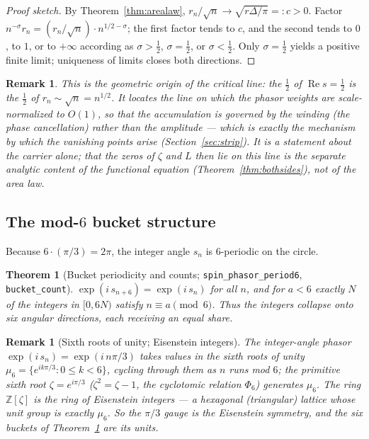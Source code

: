 \documentclass[11pt]{article}
\newtheorem{theorem}[definition]{Theorem}
\newtheorem{remark}[definition]{Remark}
\DeclareMathOperator{\Ree}{Re}
\newcommand{\Z}{\mathbb{Z}}
\newcommand{\code}[1]{\texttt{#1}}
\begin{document}
\begin{proof}[Proof sketch]
By Theorem~\ref{thm:arealaw}, $r_n/\sqrt n\to\sqrt{r\Delta/\pi}=:c>0$. Factor
$n^{-\sigma}r_n=(r_n/\sqrt n)\cdot n^{1/2-\sigma}$; the first factor tends to $c$, and the second tends
to $0$, to $1$, or to $+\infty$ according as $\sigma>\tfrac12$, $\sigma=\tfrac12$, or $\sigma<\tfrac12$.
Only $\sigma=\tfrac12$ yields a positive finite limit; uniqueness of limits closes both directions.
\end{proof}

\begin{remark}\label{rem:scalecrit}
This is the geometric origin of the critical line: the $\tfrac12$ of $\Ree s=\tfrac12$ is the $\tfrac12$
of $r_n\sim\sqrt n=n^{1/2}$. It locates the line on which the phasor weights are scale-normalized to
$O(1)$, so that the accumulation is governed by the winding (the phase cancellation) rather than the
amplitude --- which is exactly the mechanism by which the vanishing points arise
(Section~\ref{sec:strip}). It is a statement about the carrier alone; that the zeros of $\zeta$ and
$L$ then \emph{lie} on this line is the separate analytic content of the functional equation
(Theorem~\ref{thm:bothsides}), not of the area law.
\end{remark}

\subsection{The mod-$6$ bucket structure}

Because $6\cdot(\pi/3)=2\pi$, the integer angle $s_n$ is $6$-periodic on the circle.

\begin{theorem}[Bucket periodicity and counts; \code{spin\_phasor\_period6}, \code{bucket\_count}]\label{thm:buckets}
$\exp(i\,s_{n+6})=\exp(i\,s_n)$ for all $n$, and for $a<6$ exactly $N$ of the integers in
$[0,6N)$ satisfy $n\equiv a\pmod 6$. Thus the integers collapse onto six angular directions,
each receiving an equal share.
\end{theorem}

\begin{remark}[Sixth roots of unity; Eisenstein integers]\label{rem:eisenstein}
The integer-angle phasor $\exp(i\,s_n)=\exp(i\,n\pi/3)$ takes values in the sixth roots of unity
$\mu_6=\{e^{ik\pi/3}:0\le k<6\}$, cycling through them as $n$ runs mod $6$; the primitive sixth root
$\zeta=e^{i\pi/3}$ ($\zeta^2=\zeta-1$, the cyclotomic relation $\Phi_6$) generates $\mu_6$. The ring
$\Z[\zeta]$ is the ring of Eisenstein integers \cite{IrelandRosen1990} --- a hexagonal (triangular)
lattice whose unit group
is exactly $\mu_6$. So the $\pi/3$ gauge is the Eisenstein symmetry, and the six buckets of
Theorem~\ref{thm:buckets} are its units.
\end{remark}
\end{document}
